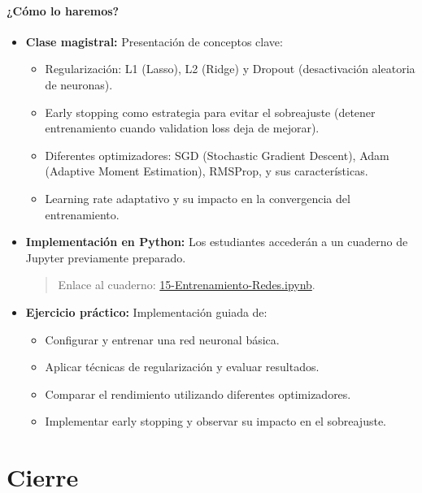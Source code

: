 \documentclass[a4,11pt]{aleph-notas}
\begin{document}
\paragraph{¿Cómo lo haremos?}
\begin{itemize}[leftmargin=*]
    \item \textbf{Clase magistral:}
    Presentación de conceptos clave:
    \begin{itemize}
        \item Regularización: L1 (Lasso), L2 (Ridge) y Dropout (desactivación aleatoria de neuronas).
        \item Early stopping como estrategia para evitar el sobreajuste (detener entrenamiento cuando validation loss deja de mejorar).
        \item Diferentes optimizadores: SGD (Stochastic Gradient Descent), Adam (Adaptive Moment Estimation), RMSProp, y sus características.
        \item Learning rate adaptativo y su impacto en la convergencia del entrenamiento.
    \end{itemize}
    
    \item \textbf{Implementación en Python:} Los estudiantes accederán a un cuaderno de Jupyter previamente preparado.
    \begin{quote}
        Enlace al cuaderno: \href{https://github.com/andres-merino/AprendizajeAutomaticoInicial-05-N0105/blob/main/2-Notebooks/15-Entrenamiento-Redes.ipynb}{15-Entrenamiento-Redes.ipynb}.
    \end{quote}
    
    \item \textbf{Ejercicio práctico:}
    Implementación guiada de:
    \begin{itemize}
        \item Configurar y entrenar una red neuronal básica.
        \item Aplicar técnicas de regularización y evaluar resultados.
        \item Comparar el rendimiento utilizando diferentes optimizadores.
        \item Implementar early stopping y observar su impacto en el sobreajuste.
    \end{itemize}
    
    
\end{itemize}

\section*{Cierre}
\end{document}
